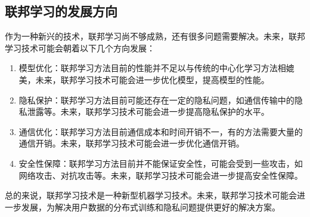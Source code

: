 \subsection{联邦学习的发展方向}

作为一种新兴的技术，联邦学习尚不够成熟，还有很多问题需要解决。未来，联邦学习技术可能会朝着以下几个方向发展：

\begin{enumerate}
    \item 模型优化：联邦学习方法目前的性能并不足以与传统的中心化学习方法相媲美，未来，联邦学习技术可能会进一步优化模型，提高模型的性能。
    \item 隐私保护：联邦学习方法目前可能还存在一定的隐私问题，如通信传输中的隐私泄露等。未来，联邦学习技术可能会进一步提高隐私保护的水平。
    \item 通信优化：联邦学习方法目前通信成本和时间开销不一，有的方法需要大量的通信开销。未来，联邦学习技术可能会进一步优化通信开销。
    \item 安全性保障：联邦学习方法目前并不能保证安全性，可能会受到一些攻击，如网络攻击、对抗攻击等。未来，联邦学习技术可能会进一步提高安全性保障。
\end{enumerate}

总的来说，联邦学习技术是一种新型机器学习技术。未来，联邦学习技术可能会进一步发展，为解决用户数据的分布式训练和隐私问题提供更好的解决方案。